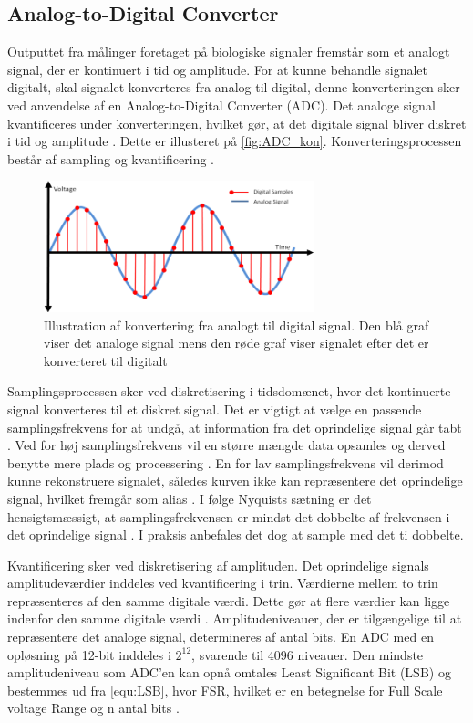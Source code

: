 \subsection{Analog-to-Digital Converter}
Outputtet fra målinger foretaget på biologiske signaler fremstår som et analogt signal, der er kontinuert i tid og amplitude. For at kunne behandle signalet digitalt, skal signalet konverteres fra analog til digital, denne konverteringen sker ved anvendelse af en Analog-to-Digital Converter (ADC). Det analoge signal kvantificeres under konverteringen, hvilket gør, at det digitale signal bliver diskret i tid og amplitude \citep{webster1998}. Dette er illusteret på \autoref{fig:ADC_kon}. Konverteringsprocessen består af sampling og kvantificering \citep{morre2003}. 

\begin{figure}[H]
\centering
\includegraphics[width=0.7\textwidth]{figures/problemloesning/adc}
\caption{Illustration af konvertering fra analogt til digital signal. Den blå graf viser det analoge signal mens den røde graf viser signalet efter det er konverteret til digitalt}
\label{fig:ADC_kon}
\end{figure}

\noindent
Samplingsprocessen sker ved diskretisering i tidsdomænet, hvor det kontinuerte signal konverteres til et diskret signal. Det er vigtigt at vælge en passende samplingsfrekvens for at undgå, at information fra det oprindelige signal går tabt \citep{morre2003}. Ved for høj samplingsfrekvens vil en større mængde data opsamles og derved benytte mere plads og processering \citep{wolf2004}. En for lav samplingsfrekvens vil derimod kunne rekonstruere signalet, således kurven ikke kan repræsentere det oprindelige signal, hvilket fremgår som alias \citep{morre2003}. I følge Nyquists sætning er det hensigtsmæssigt, at samplingsfrekvensen er mindst det dobbelte af frekvensen i det oprindelige signal \citep{morre2003}. I praksis anbefales det dog at sample med det ti dobbelte.

Kvantificering sker ved diskretisering af amplituden. Det oprindelige signals amplitudeværdier inddeles ved kvantificering i trin. Værdierne mellem to trin repræsenteres af den samme digitale værdi. Dette gør at flere værdier kan ligge indenfor den samme digitale værdi \citep{morre2003}. Amplitudeniveauer, der er tilgængelige til at repræsentere det analoge signal, determineres af antal bits. En ADC med en opløsning på 12-bit inddeles i ${2}^{12}$, svarende til 4096 niveauer. Den mindste amplitudeniveau  som ADC'en kan opnå omtales Least Significant Bit (LSB) og bestemmes ud fra \autoref{equ:LSB}, hvor FSR, hvilket er en betegnelse for Full Scale voltage Range og n antal bits \citep{webster1998, wolf2004}.

